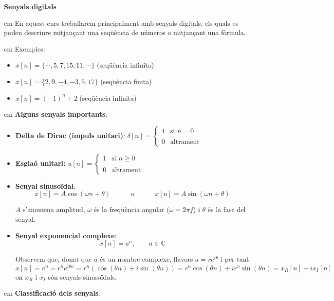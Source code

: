 \documentclass{article}
\newcommand\C{\mathbb{C}}
\begin{document}
\newpage
\noindent
\textbf{\large Senyals digitals}

 cm
\noindent
En aquest curs treballarem principalment amb senyals digitals, els quals es poden 
descriure mitjan\c{c}ant una seq\"u\`encia de n\'umeros o mitjan\c{c}ant una f\`ormula.

 cm
\noindent
Exemples:
\begin{itemize}
\item $x[n]=\{ \cdots, 5, \underline{7}, 15, 11, \cdots \}$ (seq\"u\`encia infinita)
\item $x[n]=\{2, 9, \underline{-4}, -3, 5, 17 \}$  (seq\"u\`encia finita)
\item $x[n]=(-1)^n + 2$  (seq\"u\`encia infinita)
\end{itemize}

 cm
\noindent
\textbf{Alguns senyals importants}:
\begin{itemize}
\item \textbf{Delta de Dirac (impuls unitari)}: $\delta[n]=\begin{cases} 1 & \text{si } n=0 \\ \\ 0 & \text{altrament} \end{cases}$
\item \textbf{Esgla\'o unitari:} $u[n]=\begin{cases} 1 & \text{si } n \geq 0 \\ \\ 0 & \text{altrament} \end{cases}$
\item \textbf{Senyal sinuso\"idal}:
\[
x[n]=A \cos(\omega n + \theta) \qquad \quad  \text{o}  \qquad \quad x[n]=A \sin(\omega n + \theta)
\]

\noindent
$A$ s'anomena amplitud, $\omega$ \'es la freq\"u\`encia angular ($\omega=2\pi f$) i $\theta$ \'es
la fase del senyal.

\item \textbf{Senyal exponencial complexe}:
\[
x[n]=a^n , \qquad a \in \C
\]

\noindent
Observem que, donat que $a$ \'es un nombre complexe, llavors $a=r e^{i\theta}$ i per tant
\[
x[n]=a^n = r^n e^{i \theta n} = r^n (\cos(\theta n) + i \sin(\theta n)) = r^n \cos(\theta n) + i r^n \sin(\theta n)=x_R[n]+i x_I[n]
\]
\noindent
on $x_R$ i $x_I$ s\'on senyals sinuso\"idals.

\end{itemize}

 cm
\noindent
\textbf{Classificaci\'o dels senyals}. 
\end{document}
